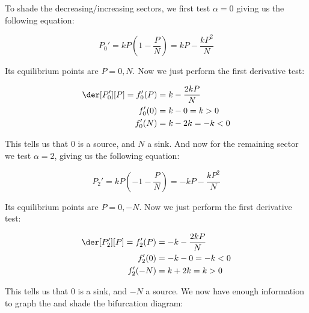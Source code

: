\documentclass{article}
\begin{document}

To shade the decreasing/increasing sectors, we first test $\alpha=0$ giving us the following equation:

\begin{equation*}
    P_0'=kP\left(1-\frac{P}{N}\right)=kP-\frac{kP^2}{N}
\end{equation*}

Its equilibrium points are $P=0,N$. Now we just perform the first derivative test:

\begin{align*}
    \der[P_0'][P]=f_0'(P)&=k-\frac{2kP}{N}\\
    f_0'(0)&=k-0=k>0\\
    f_0'(N)&=k-2k=-k<0
\end{align*}

This tells us that 0 is a source, and $N$ a sink. And now for the remaining sector we test $\alpha=2$, giving us the following equation:

\begin{equation*}
    P_2'=kP\left(-1-\frac{P}{N}\right)=-kP-\frac{kP^2}{N}
\end{equation*}

Its equilibrium points are $P=0,-N$. Now we just perform the first derivative test:

\begin{align*}
    \der[P_2'][P]=f_2'(P)&=-k-\frac{2kP}{N}\\
    f_2'(0)&=-k-0=-k<0\\
    f_2'(-N)&=k+2k=k>0
\end{align*}

This tells us that 0 is a sink, and $-N$ a source. We now have enough information to graph the and shade the bifurcation diagram:
\end{document}
